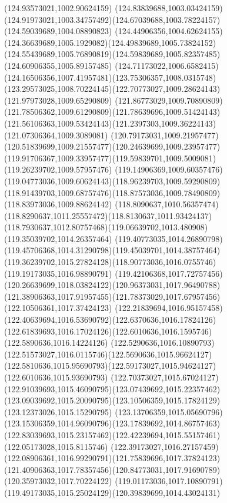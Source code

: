 {{\lineto(124.93573021,1002.90624159)
\lineto(124.83839688,1003.03424159)
\curveto(124.91973021,1003.34757492)(124.67039688,1003.78224157)(124.59039689,1004.08890823)
\curveto(124.44906356,1004.62624155)(124.36639689,1005.1929082)(124.49839689,1005.73824152)
\curveto(124.55439689,1005.76890819)(124.59839689,1005.82357485)(124.60906355,1005.89157485)
\curveto(124.71173022,1006.6582415)(124.16506356,1007.41957481)(123.75306357,1008.0315748)
\curveto(123.29573025,1008.70224145)(122.70773027,1009.28624143)(121.97973028,1009.65290809)
\curveto(121.86773029,1009.70890809)(121.78506362,1009.61290809)(121.78639696,1009.51424143)
\curveto(121.56106363,1009.53424143)(121.2397303,1009.36224143)(121.07306364,1009.3089081)
\curveto(120.79173031,1009.21957477)(120.51839699,1009.21557477)(120.24639699,1009.23957477)
\curveto(119.91706367,1009.33957477)(119.59839701,1009.5009081)(119.26239702,1009.57957476)
\curveto(119.14906369,1009.60357476)(119.04773036,1009.60624143)(118.96239703,1009.59290809)
\curveto(118.91439703,1009.68757476)(118.87573036,1009.78490809)(118.83973036,1009.88624142)
\curveto(118.8090637,1010.56357474)(118.8290637,1011.25557472)(118.8130637,1011.93424137)
\curveto(118.7930637,1012.80757468)(119.06639702,1013.480908)(119.35039702,1014.26357464)
\curveto(119.40773035,1014.26890798)(119.45706368,1014.31290798)(119.45039701,1014.38757464)
\curveto(119.36239702,1015.27824128)(118.90773036,1016.0755746)(119.19173035,1016.98890791)
\curveto(119.42106368,1017.72757456)(120.26639699,1018.03824122)(120.96373031,1017.96490788)
\curveto(121.38906363,1017.91957455)(121.78373029,1017.67957456)(122.10506361,1017.37424123)
\curveto(122.21839694,1016.95157458)(122.40639694,1016.53690792)(122.6370636,1016.17824126)
\curveto(122.61839693,1016.17024126)(122.6010636,1016.1595746)(122.5890636,1016.14224126)
\curveto(122.5290636,1016.10890793)(122.51573027,1016.0115746)(122.5690636,1015.96624127)
\curveto(122.5810636,1015.95690793)(122.59173027,1015.94624127)(122.6010636,1015.93690793)
\curveto(122.70373027,1015.67024127)(122.91039693,1015.46090795)(123.07439692,1015.22357462)
\curveto(123.09039692,1015.20090795)(123.10506359,1015.17824129)(123.12373026,1015.15290795)
\curveto(123.13706359,1015.05690796)(123.15306359,1014.96090796)(123.17839692,1014.86757463)
\curveto(122.83039693,1015.23157462)(122.42239694,1015.55157461)(122.05173028,1015.8115746)
\curveto(122.39173027,1016.27157459)(122.08906361,1016.99290791)(121.75839696,1017.37824123)
\curveto(121.40906363,1017.78357456)(120.84773031,1017.91690789)(120.35973032,1017.70224122)
\curveto(119.01173036,1017.10890791)(119.49173035,1015.25024129)(120.39839699,1014.43024131)
}}
